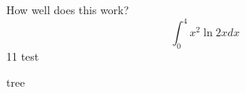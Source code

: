 \documentclass{article}
\begin{document}
How well does this work?
$$\int_0^4 x^2 \ln{2x}dx$$
11  test

tree
\end{document}
